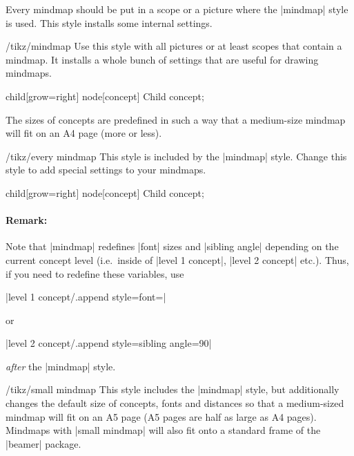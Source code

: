 Every mindmap should be put in a scope or a picture where the |mindmap| style
is used. This style installs some internal settings.

\begin{stylekey}{/tikz/mindmap}
    Use this style with all pictures or at least scopes that contain a mindmap.
    It installs a whole bunch of settings that are useful for drawing mindmaps.
\begin{codeexample}[preamble={\usetikzlibrary{mindmap}}]
\tikz[mindmap,concept color=red!50]
    child[grow=right] {node[concept] {Child concept}};
\end{codeexample}
    The sizes of concepts are predefined in such a way that a medium-size
    mindmap will fit on an A4 page (more or less).
    \begin{stylekey}{/tikz/every mindmap}
        This style is included by the |mindmap| style. Change this style to add
        special settings to your mindmaps.
\begin{codeexample}[preamble={\usetikzlibrary{mindmap}}]
\tikz[large mindmap,concept color=red!50]
    child[grow=right] {node[concept] {Child concept}};
\end{codeexample}
    \end{stylekey}

    \paragraph{Remark:}
    Note that |mindmap| redefines |font| sizes and |sibling angle| depending on
    the current concept level (i.e.\ inside of |level 1 concept|,
    |level 2 concept| etc.). Thus, if you need to redefine these variables, use

    |level 1 concept/.append style={font=\small}|

    \noindent or

    |level 2 concept/.append style={sibling angle=90}|

    \noindent \emph{after} the |mindmap| style.
\end{stylekey}

\begin{stylekey}{/tikz/small mindmap}
    This style includes the |mindmap| style, but additionally changes the
    default size of concepts, fonts and distances so that a medium-sized
    mindmap will fit on an A5 page (A5 pages are half as large as A4 pages).
    Mindmaps with |small mindmap| will also fit onto a standard frame of the
    |beamer| package.
\end{stylekey}

